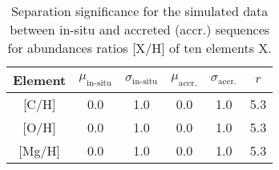 \begin{table}
    \centering
    \caption{Separation significance for the simulated data between in-situ and accreted (accr.) sequences for abundances ratios [X/H] of ten elements X.}
    \begin{tabular}{cccccc}
    \hline
    Element & $\mu_\text{in-situ}$ & $\sigma_\text{in-situ}$ & $\mu_\text{accr.}$ & $\sigma_\text{accr.}$ & $r$\\
    \hline \hline
    {[C/H]}  & 0.0 & 1.0 & 0.0 & 1.0 & 5.3 \\
    {[O/H]}  & 0.0 & 1.0 & 0.0 & 1.0 & 5.3 \\
    {[Mg/H]}  & 0.0 & 1.0 & 0.0 & 1.0 & 5.3 \\
    \hline
    \end{tabular}
    \label{tab:r_values_simulation}
\end{table}
